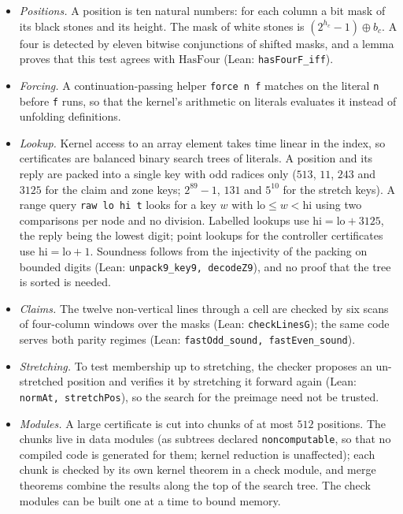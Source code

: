 \documentclass[11pt,a4paper]{article}
\theoremstyle{plain}
\theoremstyle{definition}
\newcommand{\code}[1]{{\upshape\texttt{\small\nolinkurl{#1}}}}
\newcommand{\leanref}[1]{(Lean: \code{#1})}
\newcommand{\HasFour}{\mathrm{HasFour}}
\begin{document}
\begin{itemize}
  \item \emph{Positions.} A position is ten natural numbers: for each column a bit mask of its black stones and its height. The mask of white stones is $(2^{h_c}-1)\oplus b_c$. A four is detected by eleven bitwise conjunctions of shifted masks, and a lemma proves that this test agrees with $\HasFour$ \leanref{hasFourF_iff}.
  \item \emph{Forcing.} A continuation-passing helper \code{force n f} matches on the literal \code{n} before \code{f} runs, so that the kernel's arithmetic on literals evaluates it instead of unfolding definitions.
  \item \emph{Lookup.} Kernel access to an array element takes time linear in the index, so certificates are balanced binary search trees of literals. A position and its reply are packed into a single key with odd radices only ($513$, $11$, $243$ and $3125$ for the claim and zone keys; $2^{89}-1$, $131$ and $5^{10}$ for the stretch keys). A range query \code{raw lo hi t} looks for a key $w$ with $\mathrm{lo}\le w<\mathrm{hi}$ using two comparisons per node and no division. Labelled lookups use $\mathrm{hi}=\mathrm{lo}+3125$, the reply being the lowest digit; point lookups for the controller certificates use $\mathrm{hi}=\mathrm{lo}+1$. Soundness follows from the injectivity of the packing on bounded digits \leanref{unpack9_key9, decodeZ9}, and no proof that the tree is sorted is needed.
  \item \emph{Claims.} The twelve non-vertical lines through a cell are checked by six scans of four-column windows over the masks \leanref{checkLinesG}; the same code serves both parity regimes \leanref{fastOdd_sound, fastEven_sound}.
  \item \emph{Stretching.} To test membership up to stretching, the checker proposes an un-stretched position and verifies it by stretching it forward again \leanref{normAt, stretchPos}, so the search for the preimage need not be trusted.
  \item \emph{Modules.} A large certificate is cut into chunks of at most $512$ positions. The chunks live in data modules (as subtrees declared \code{noncomputable}, so that no compiled code is generated for them; kernel reduction is unaffected); each chunk is checked by its own kernel theorem in a check module, and merge theorems combine the results along the top of the search tree. The check modules can be built one at a time to bound memory.
\end{itemize}
\end{document}
